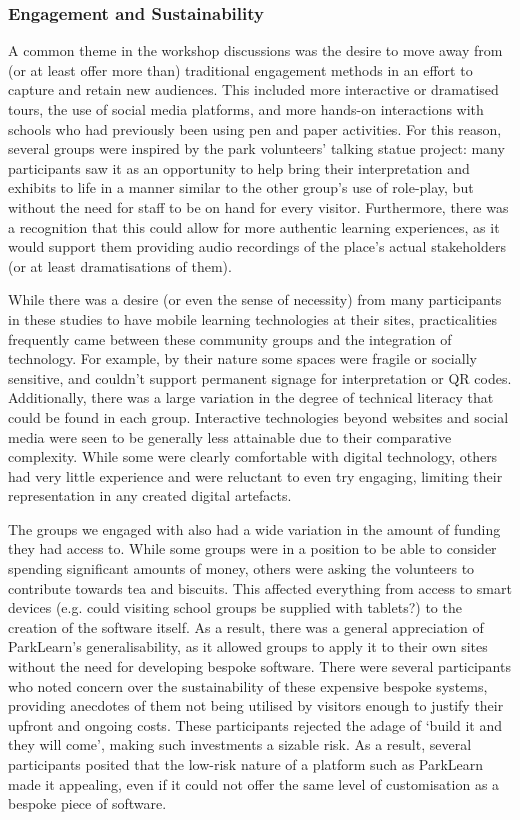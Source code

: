 \subsubsection{Engagement and Sustainability}

A common theme in the workshop discussions was the desire to move away from (or at least offer more than) traditional engagement methods in an effort to capture and retain new audiences. This included more interactive or dramatised tours, the use of social media platforms, and more hands-on interactions with schools who had previously been using pen and paper activities. For this reason, several groups were inspired by the park volunteers' talking statue project: many participants saw it as an opportunity to help bring their interpretation and exhibits to life in a manner similar to the other group's use of role-play, but without the need for staff to be on hand for every visitor. Furthermore, there was a recognition that this could allow for more authentic learning experiences, as it would support them providing audio recordings of the place's actual stakeholders (or at least dramatisations of them).

While there was a desire (or even the sense of necessity) from many participants in these studies to have mobile learning technologies at their sites, practicalities frequently came between these community groups and the integration of technology. For example, by their nature some spaces were fragile or socially sensitive, and couldn't support permanent signage for interpretation or QR codes. Additionally, there was a large variation in the degree of technical literacy that could be found in each group. Interactive technologies beyond websites and social media were seen to be generally less attainable due to their comparative complexity. While some were clearly comfortable with digital technology, others had very
little experience and were reluctant to even try engaging, limiting their representation in any created digital artefacts.

The groups we engaged with also had a wide variation in the amount of funding they had access to. While some groups were in a position to be able to consider spending significant amounts of money, others were asking the volunteers to contribute towards tea and biscuits. This affected everything from access to smart devices (e.g. could visiting school groups be supplied with tablets?) to the creation of the software itself. As a result, there was a general appreciation of ParkLearn's generalisability, as it allowed groups to apply it to their own sites without the need for developing bespoke software. There were several participants who noted concern over the sustainability of these expensive bespoke systems, providing anecdotes of them not being utilised by visitors enough to justify their upfront and ongoing costs. These participants rejected the adage of `build it and they will come', making such investments a sizable risk. As a result, several participants posited that the low-risk nature of a platform such as ParkLearn made it appealing, even if it could not offer the same level of customisation as a bespoke piece of software.

